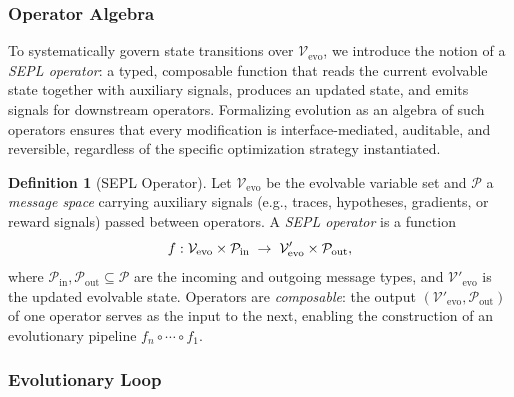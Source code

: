 \documentclass{article}
\theoremstyle{plain}
\theoremstyle{definition}
\newtheorem{definition}[theorem]{Definition}
\theoremstyle{remark}
\begin{document}
\vspace{-0.2cm}
\subsubsection{Operator Algebra}
\vspace{-0.2cm}

To systematically govern state transitions over $\mathcal{V}_{\text{evo}}$, we introduce the notion of a \emph{SEPL operator}: a typed, composable function that reads the current evolvable state together with auxiliary signals, produces an updated state, and emits signals for downstream operators. Formalizing evolution as an algebra of such operators ensures that every modification is interface-mediated, auditable, and reversible, regardless of the specific optimization strategy instantiated.

\begin{definition}[SEPL Operator]
\label{def:sepl-operator}
Let $\mathcal{V}_{\text{evo}}$ be the evolvable variable set and $\mathcal{P}$ a \emph{message space} carrying auxiliary signals (e.g., traces, hypotheses, gradients, or reward signals) passed between operators. A \emph{SEPL operator} is a function
\begin{equation}
\footnotesize
f: \mathcal{V}_{\text{evo}} \times \mathcal{P}_{\text{in}} \;\rightarrow\; \mathcal{V}'_{\text{evo}} \times \mathcal{P}_{\text{out}},
\end{equation}
where $\mathcal{P}_{\text{in}}, \mathcal{P}_{\text{out}} \subseteq \mathcal{P}$ are the incoming and outgoing message types, and $\mathcal{V}'_{\text{evo}}$ is the updated evolvable state. Operators are \emph{composable}: the output $(\mathcal{V}'_{\text{evo}}, \mathcal{P}_{\text{out}})$ of one operator serves as the input to the next, enabling the construction of an evolutionary pipeline $f_n \circ \cdots \circ f_1$.
\end{definition}

\vspace{-0.2cm}
\subsubsection{Evolutionary Loop}
\vspace{-0.2cm}
\end{document}
